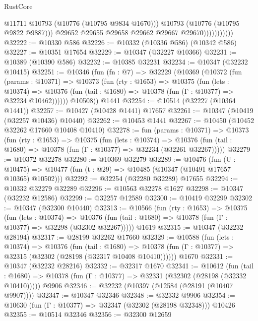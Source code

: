 \begin{lexlean}{RustCore}
\begin{coremodule}
                              @11711
                              @10793
                              (@10776 (@10795 @9834 @1670)))
                            @10793
                            (@10776 (@10795 @9822 @9887)))
                          @29652
                          @29655
                          @29658
                          @29662
                          @29667
                          @29670)))))))))))
@32222 := @10330 @586
@32226 := @10332 (@10336 @586) (@10342 @586)
@32227 := @10351 @17654
@32229 := @10347 (@32227 @10366)
@32231 := @10389 (@10390 @586)
@32232 := @10385 @32231
@32234 := @10347 (@32232 @10415)
@32251 := @10346
    (fun (fn : @7) =>
    @32229
      (@10369
        (@10372
          (fun (params : @10371) =>
          @10373
            (fun (rty : @1653) =>
            @10375
              (fun (lets : @10374) =>
              @10376 (fun (tail : @1680) => @10378 (fun (Γ : @10377) => @32234 @10462))))))
        @10508))
    @1441
@32254 := @10514 (@32227 (@10364 @1441))
@32257 := @10427 (@10428 @1441) @17657
@32261 := @10347 (@10419 (@32257 @10436) @10440)
@32262 := @10453 @1441
@32267 := @10450 (@10452 @32262 @17660 @10408 @10410)
@32278 := fun (params : @10371) =>
  @10373
    (fun (rty : @1653) =>
    @10375
      (fun (lets : @10374) =>
      @10376 (fun (tail : @1680) => @10378 (fun (Γ : @10377) => @32234 (@32261 @32267)))))
@32279 := @10372 @32278
@32280 := @10369 @32279
@32289 := @10476
    (fun (U : @10475) => @10477 (fun (t : @29) => @10485 (@10347 (@10491 @17657 @10365) @10502)))
@32292 := @32254 (@32280 @32289) @17655
@32294 := @10332 @32279 @32289
@32296 := @10563 @32278 @1627
@32298 := @10347 (@32232 @12586)
@32299 := @32257 @12589
@32300 := @10419 @32299
@32302 := @10347 (@32300 @10440)
@32313 := @10566
    (fun (rty : @1653) =>
    @10375
      (fun (lets : @10374) =>
      @10376 (fun (tail : @1680) => @10378 (fun (Γ : @10377) => @32298 (@32302 @32267)))))
    @1619
@32315 := @10347 (@32232 @28194)
@32317 := @28199 @32262 @17660
@32329 := @10588
    (fun (lets : @10374) =>
    @10376
      (fun (tail : @1680) =>
      @10378 (fun (Γ : @10377) => @32315 (@32302 (@28198 (@32317 @10408 @10410))))))
    @1670
@32331 := @10347 (@32232 @28216)
@32332 := @32317 @1670
@32341 := @10612
    (fun (tail : @1680) => @10378 (fun (Γ : @10377) => @32331 (@32302 (@28198 (@32332 @10410)))))
    @9906
@32346 := @32232 (@10397 (@12584 (@28191 (@10407 @9907))))
@32347 := @10347 @32346
@32348 := @32332 @9906
@32354 := @10630 (fun (Γ : @10377) => @32347 (@32302 (@28198 @32348))) @10426
@32355 := @10514 @32346
@32356 := @32300 @12659

\end{coremodule}
\end{lexlean}

